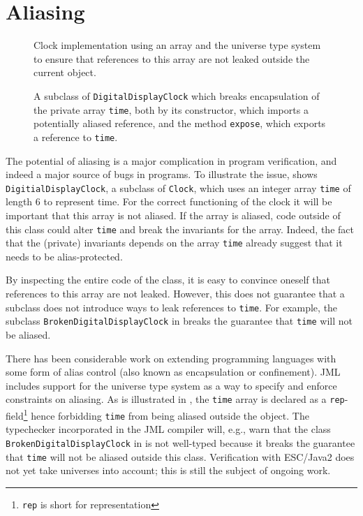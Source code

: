 \documentclass{llncs}
\begin{document}
\section{Aliasing}
\label{Sec:ownership}

\begin{figure}[tbp] \label{Example:alias}
%
%
\vspace*{-3ex} %
\caption{Clock implementation using an array and the universe type 
  system to ensure that references to this array are not leaked outside the
  current object.}
\end{figure}

\begin{figure}[tbp] \label{Example:brokenalias}
%
%
\vspace*{-2ex} %
\caption{A subclass of \texttt{DigitalDisplayClock} which breaks encapsulation
  of the private array \texttt{time}, both by its constructor, which imports a
  potentially aliased reference, and the method \texttt{expose}, which exports
  a reference to \texttt{time}.}
\end{figure}

The potential of aliasing is a major complication in program verification,
and indeed a major source of bugs in programs. 
To illustrate the issue,  shows
\texttt{DigitialDisplayClock},
a subclass of \texttt{Clock}, which uses an integer array \texttt{time} of length 6 
to represent time.  For the correct functioning of the clock it will be 
important that this array is not aliased. If the array is aliased, code 
outside of this class could alter \texttt{time} and break the invariants for the array.
Indeed, the fact that the (private) invariants depends on the array 
\texttt{time} already suggest that it needs to be alias-protected.

By inspecting the entire code of the class, it is easy to convince
oneself that references to this array are not leaked.
However, this does not guarantee that a subclass does not introduce
ways to leak references to \texttt{time}.
For example, the subclass \texttt{BrokenDigitalDisplayClock} in 
 breaks the guarantee that \texttt{time}
will not be aliased.

There has been considerable work on extending programming languages
with some form of alias control (also known as encapsulation or confinement).
JML includes support for the universe type system
\cite{Mueller-Poetzsch-Heffter-Leavens03} as a way to specify
and enforce constraints on aliasing. As is illustrated in 
, the \texttt{time} array is declared
as a \texttt{rep}-field\footnote{\texttt{rep} is short for representation}
hence forbidding \texttt{time} from being aliased outside the object.
The typechecker incorporated in the JML compiler
will, e.g., warn that the class \texttt{BrokenDigitalDisplayClock}
in  is not well-typed because it breaks 
the guarantee that \texttt{time} will not be aliased outside this class.
Verification with ESC/Java2 does not yet take universes into account;
this is still the subject of ongoing work.
\end{document}
